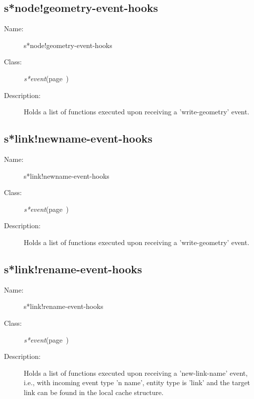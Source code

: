 \subsection{s*node!geometry-event-hooks}
\label{s*node!geometry-event-hooks}

\begin{description}

\item [Name:]  s*node!geometry-event-hooks


\item [Class:]
{\sl s*event}\hfill(page~\pageref{s*event})


\item [Description:]
Holds a list of functions executed upon receiving a
'write-geometry' event.


\end{description}
\horizontalline

\subsection{s*link!newname-event-hooks}
\label{s*link!newname-event-hooks}

\begin{description}
\item [Name:]  s*link!newname-event-hooks

\item [Class:]
{\sl s*event}\hfill(page~\pageref{s*event})

\item [Description:]
Holds a list of functions executed upon receiving
a 'write-geometry' event.


\end{description}
\horizontalline

\subsection{s*link!rename-event-hooks}
\label{s*link!rename-event-hooks}

\begin{description}
\item [Name:]  s*link!rename-event-hooks

\item [Class:]
{\sl s*event}\hfill(page~\pageref{s*event})

\item [Description:]
Holds a list of functions executed upon receiving a
'new-link-name' event, i.e., with incoming event
type 'n name', entity type is 'link' and the target
link can be found in the local cache structure.


\end{description}
\horizontalline

